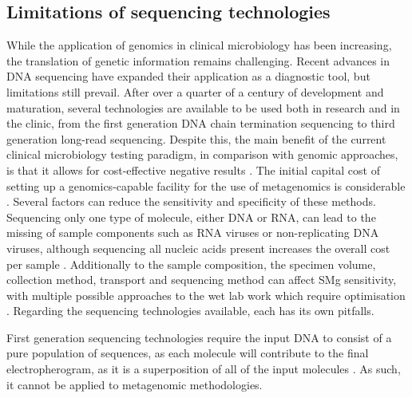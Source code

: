 \subsection{Limitations of sequencing technologies}

While the application of genomics in clinical microbiology has been increasing, the translation of genetic information remains challenging. Recent advances in DNA sequencing have expanded their application as a diagnostic tool, but limitations still prevail. After over a quarter of a century of development and maturation, several technologies are available to be used both in research and in the clinic, from the first generation DNA chain termination sequencing to third generation long-read sequencing. Despite this, the main benefit of the current clinical microbiology testing paradigm, in comparison with genomic approaches, is that it allows for cost-effective negative results \citep{greninger_challenge_2018}. The initial capital cost of setting up a genomics-capable facility for the use of metagenomics is considerable \citep{greninger_challenge_2018}. Several factors can reduce the sensitivity and specificity of these methods. Sequencing only one type of molecule, either \ac{DNA} or \ac{RNA}, can lead to the missing of sample components such as RNA viruses or non-replicating DNA viruses, although sequencing all nucleic acids present increases the overall cost per sample \citep{schuele_future_2021}. Additionally to the sample composition, the specimen volume, collection method, transport and sequencing method can affect \ac{SMg} sensitivity, with multiple possible approaches to the wet lab work which require optimisation \citep{petersen_third-generation_2019}. Regarding the sequencing technologies available, each has its own pitfalls. 

First generation sequencing technologies require the input \ac{DNA} to consist of a pure population of sequences, as each molecule will contribute to the final electropherogram, as it is a superposition of all of the input molecules \citep{hagemann_overview_2015}. As such, it cannot be applied to metagenomic methodologies.


